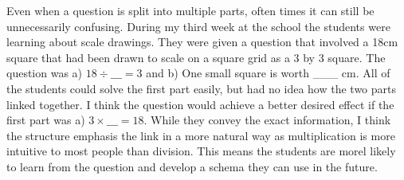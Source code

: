 \documentclass[11pt, a4paper, notitlepage]{article}
\begin{document}
\par
Even when a question is split into multiple parts, often times it can still be unnecessarily confusing. During my third week at the school the students were learning about scale drawings. They were given a question that involved a 18cm square that had been drawn to scale on a square grid as a 3 by 3 square. The question was a) $18 \div \_\_\_= 3$ and b) One small square is worth \_\_\_ cm. All of the students could solve the first part easily, but had no idea how the two parts linked together. I think the question would achieve a better desired effect if the first part was a) $3\times\_\_\_ = 18$. While they convey the exact information, I think the structure emphasis the link in a more natural way as multiplication is more intuitive to most people than division. This means the students are morel likely to learn from the question and develop a schema they can use in the future.
\end{document}
